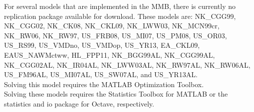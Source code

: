 \documentclass[11pt,a4paper]{article}
\begin{document}
	\noindent\footnotemark[1] For several models that are implemented in the MMB, there is currently no replication package available for download. These models are: NK\_CGG99, NK\_CGG02, NK\_CK08, NK\_CKL09, NK\_LWW03,  NK\_MCN99cr, NK\_RW06, NK\_RW97, US\_FRB08, US\_MI07, US\_PM08, US\_OR03, US\_RS99, US\_VMDno, US\_VMDop, US\_YR13, EA\_CKL09, EAUS\_NAWMctww, HL\_FPP11, NK\_BGG99AL, NK\_CGG99AL, NK\_CGG02AL, NK\_IR04AL, NK\_LWW03AL, NK\_RW97AL, NK\_RW06AL, US\_FM96AL,  US\_MI07AL, US\_SW07AL, and US\_YR13AL.\\ 
	
	
	\noindent \footnotemark[2] Solving this model requires the MATLAB Optimization Toolbox.\\
	
	\noindent \footnotemark[3] Solving these models requires the Statistics Toolbox for MATLAB or the statistics and io package for Octave, respectively.
	
	
	
	
	
\end{document}
